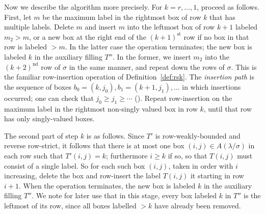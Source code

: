 Now we describe the algorithm more precisely. For $k=r,\ldots,1$, proceed as follows. First, let $m$ be the maximum label in the rightmost box of row $k$ that has multiple labels. Delete $m$ and insert $m$ into the leftmost box of row $k+1$ labeled $m_2>m$, or a new box at the right end of the $(k+1)^\text{st}$ row if no box in that row is labeled $>m$. In the latter case the operation terminates; the new box is labeled $k$ in the auxiliary filling $T''$. In the former, we insert $m_2$ into the $(k+2)^\text{nd}$ row of $\sigma$ in the same manner, and repeat down the rows of $\sigma$. This is the familiar row-insertion operation of Definition~\ref{def:rsk}. The \emph{insertion path} is the sequence of boxes $b_0 = (k,j_0),b_1=(k\!+\!1,j_1),\ldots$ in which insertions occurred; one can check that $j_0 \ge j_1 \ge \cdots$ (\cite[Lemma~7.11.2]{ec2}). Repeat row-insertion on the maximum label in the rightmost non-singly valued box in row $k$, until that row has only singly-valued boxes. 

The second part of step $k$ is as follows. Since $T'$ is row-weakly-bounded and reverse row-strict, it follows that there is at most one box $(i,j)\in A(\lambda/\sigma)$ in each row such that $T'(i,j)= k$; furthermore $i\ge k$ if so, so that $T(i,j)$ must consist of a single label. So for each such box $(i,j)$, taken in order with $i$ increasing, delete the box and row-insert the label $T(i,j)$ it starting in row $i+1$. When the operation terminates, the new box is labeled $k$ in the auxiliary filling $T''$. We note for later use that in this stage, every box labeled $k$ in $T''$ is the leftmost of its row, since all boxes labelled $>k$ have already been removed.



